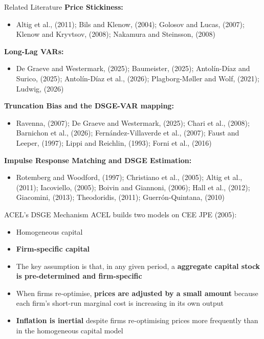 \documentclass[11pt]{beamer}
\begin{document}
\begin{frame}{Related Literature}
    \textbf{Price Stickiness:}
    \begin{itemize}
        \item {\footnotesize Altig et al., (2011); Bils and Klenow, (2004); Golosov and Lucas, (2007); Klenow and Kryvtsov, (2008); Nakamura and Steinsson, (2008)}
    \end{itemize}
    \textbf{Long-Lag VARs:}
    \begin{itemize}
        \item {\footnotesize De Graeve and Westermark, (2025); Baumeister, (2025); Antolín-Díaz and Surico, (2025); Antolín-Díaz et al., (2026); Plagborg-M{\o}ller and Wolf, (2021); Ludwig, (2026)}
    \end{itemize}
    \textbf{Truncation Bias and the DSGE-VAR mapping:}
    \begin{itemize}
        \item {\footnotesize Ravenna, (2007); De Graeve and Westermark, (2025); Chari et al., (2008); Barnichon et al., (2026); Fernández-Villaverde et al., (2007); Faust and Leeper, (1997); Lippi and Reichlin, (1993); Forni et al., (2016)}
    \end{itemize}
    \textbf{Impulse Response Matching and DSGE Estimation:}
    \begin{itemize}
        \item {\footnotesize Rotemberg and Woodford, (1997); Christiano et al., (2005); Altig et al., (2011); Iacoviello, (2005); Boivin and Giannoni, (2006); Hall et al., (2012); Giacomini, (2013); Theodoridis, (2011); Guerrón-Quintana, (2010)}
    \end{itemize}
\end{frame}


\begin{frame}{ACEL's DSGE Mechanism}
    ACEL builds two models on CEE JPE (2005):
    \begin{itemize}
        \item Homogeneous capital
        \item \textbf{Firm-specific capital}
    \end{itemize}
    \vspace{0.5cm}
    
    \begin{itemize}
        \item The key assumption is that, in any given period, a \textbf{aggregate capital stock is pre-determined and firm-specific}
        \item When firms re-optimise, \textbf{prices are adjusted by a small amount} because each firm's short-run marginal cost is increasing in its own output
        \item \textbf{Inflation is inertial} despite firms re-optimising prices more frequently than in the homogeneous capital model
    \end{itemize}    
\end{frame}
\end{document}
